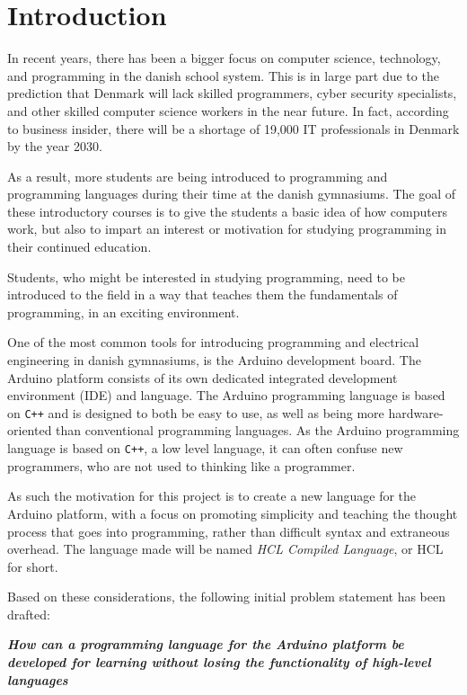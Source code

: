 \chapter{Introduction}
In recent years, there has been a bigger focus on computer science, technology, and programming in the danish school system.
This is in large part due to the prediction that Denmark will lack skilled programmers, cyber security specialists, and other skilled computer science workers in the near future.
In fact, according to business insider, there will be a shortage of 19,000 IT professionals in Denmark by the year 2030\cite{ITLackDK}.

As a result, more students are being introduced to programming and programming languages during their time at the
danish gymnasiums. 
The goal of these introductory courses is to give the students a basic idea of how computers work, but also to impart an interest or motivation for studying programming in their continued education.

Students, who might be interested in studying programming, need to be introduced to the field in a way that teaches them the fundamentals of programming, in an exciting environment.

One of the most common tools for introducing programming and electrical engineering in danish gymnasiums, is the Arduino development board. 
The Arduino platform consists of its own dedicated integrated development environment (IDE) and language.
The Arduino programming language is based on \texttt{C++} and is designed to both be easy to use, as well as being more hardware-oriented than conventional programming languages\cite{ArFAQ}.
As the Arduino programming language is based on \texttt{C++}, a low level language, it can often confuse new programmers, who are not used to thinking like a programmer.

As such the motivation for this project is to create a new language for the Arduino platform, with a focus on promoting simplicity and teaching the thought process that goes into programming, rather than difficult syntax and extraneous overhead.
The language made will be named \textit{HCL Compiled Language}, or HCL for short.

Based on these considerations, the following initial problem statement has been drafted:

\begin{center}
	\textit{\textbf{How can a programming language for the Arduino platform be developed for learning without losing the functionality of high-level languages}}
\end{center}
